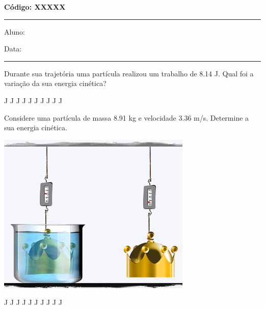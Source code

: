 \documentclass[12pt, addpoints]{exam}
\begin{document}
\begin{minipage}[r]{0.45\linewidth}
    \begin{flushright}
        {\bf \Large Código: XXXXX}
    \end{flushright}
\end{minipage}
\vspace{0.5cm} \hrule \vspace{0.5cm}
\begin{minipage}{0.75\linewidth}
    Aluno:
\end{minipage}
\begin{minipage}{0.20\linewidth}
    Data: 
\end{minipage}
\vspace{0.5cm} \hrule \vspace{0.5cm}

\begin{questions}
\begin{multicols}{2}
\question[33] Durante sua trajetória uma partícula realizou um trabalho de    8.14 J. Qual foi a variação da sua energia cinética?
\begin{oneparchoices}
 J J J J J J J J J J\end{oneparchoices}
\question[23] Considere uma partícula de massa    8.91 kg e velocidade    3.36 m/s. Determine a sua energia cinética.
\begin{center}
\begin{minipage}[c]{0.75\linewidth}
\includegraphics[width=\textwidth]{MWE001.jpg}
\end{minipage}
\end{center}
\begin{oneparchoices}
 J J J J J J J J J J\end{oneparchoices}
\end{multicols}
\end{questions}
\newpage
\end{document}
